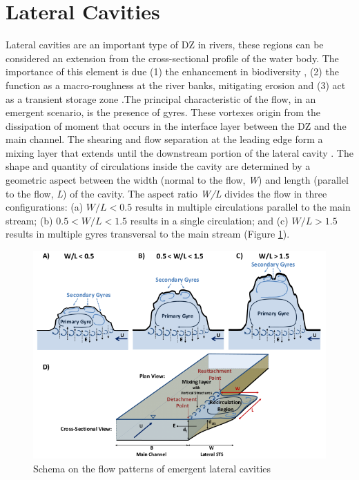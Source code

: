 \section{Lateral Cavities}
Lateral cavities are an important type of DZ in rivers, these regions can be considered an extension from the cross-sectional profile of the water body. The importance of this element is due (1) the enhancement in biodiversity \cite{ribi2014,harvey2016}, (2) the function as a macro-roughness at the river banks, mitigating erosion \cite{juez2018} and (3) act as a transient storage zone \cite{jackson2013,drost2014,jackson2015}.The principal characteristic of the flow, in an emergent scenario, is the presence of gyres. These vortexes origin from the dissipation of moment that occurs in the interface layer between the DZ and the main channel. The shearing and flow separation at the leading edge form a mixing layer that extends until the downstream portion of the lateral cavity \cite{uijttewaal2005,jackson2013}. The shape and quantity of circulations inside the cavity are determined by a geometric aspect between the width (normal to the flow, \textit{W}) and length (parallel to the flow, \textit{L}) of the cavity. The aspect ratio \textit{W/L} divides the flow in three configurations: (a) $W/L<0.5$ results in multiple circulations parallel to the main stream; (b) $0.5<W/L<1.5$ results in a single circulation; and (c) $W/L>1.5$ results in multiple gyres transversal to the main stream \cite{weitbrecht2001,jackson2013,sukhodolov2014}(Figure \ref{fig:lCavitySchema}).

\begin{figure}[!ht]
\centering
\includegraphics[width=0.9\linewidth]{../images/introduction/lateralCavitySchema.png}
\caption{Schema on the flow patterns of emergent lateral cavities \cite{jackson2013}}
\label{fig:lCavitySchema}
\end{figure}


